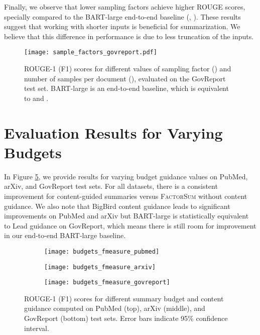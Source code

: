 \documentclass[11pt,table]{article}
\newcommand{\modelname}{FactorSum}
\begin{document}
Finally, we observe that lower sampling factors achieve higher ROUGE scores, specially compared to the BART-large end-to-end baseline (, ). These results suggest that working with shorter inputs is beneficial for summarization. We believe that this difference in performance is due to less truncation of the inputs. 

\begin{figure}
    \centering
    \texttt{[image: sample\_factors\_govreport.pdf]}
    \caption{ROUGE-1 (F1) scores for different values of sampling factor () and number of samples per document (), evaluated on the GovReport test set. BART-large is an end-to-end baseline, which is equivalent to  and .}\label{fig:sample_factors}
\end{figure}

\section{Evaluation Results for Varying Budgets}
In Figure \ref{fig:budgets_fmeasure}, we provide results for varying budget guidance values on PubMed, arXiv, and GovReport test sets. For all datasets, there is a consistent improvement for content-guided summaries versus \textsc{\modelname} without content guidance. We also note that BigBird content guidance leads to significant improvements on PubMed and arXiv but BART-large is statistically equivalent to Lead guidance on GovReport, which means there is still room for improvement in our end-to-end BART-large baseline. 

\label{sec:budgets_fmeasure}
\begin{figure}
    \centering
    \begin{subfigure}[b]{.49\textwidth}
         \centering
         \texttt{[image: budgets\_fmeasure\_pubmed]}
\label{fig:budgets_fmeasure_pubmed}
     \end{subfigure}
     \hfill
     \begin{subfigure}[b]{.49\textwidth}
         \centering
         \texttt{[image: budgets\_fmeasure\_arxiv]}
\label{fig:budgets_fmeasure_arxiv}
     \end{subfigure}
     \begin{subfigure}[b]{.49\textwidth}
         \centering
         \texttt{[image: budgets\_fmeasure\_govreport]}
         \label{fig:budgets_fmeasure_govreport}
     \end{subfigure}
    \vspace{-1.2\baselineskip}
    \caption{ROUGE-1 (F1) scores for different summary budget and content guidance computed on PubMed (top), arXiv (middle), and GovReport (bottom) test sets. Error bars indicate 95\% confidence interval.}
    \label{fig:budgets_fmeasure}
\end{figure}
\end{document}
